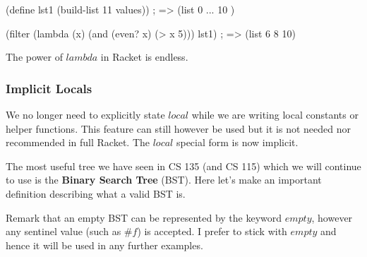 \begin{code}[Lisp]
(define lst1 (build-list 11 values)) ; => (list 0 ... 10 )

(filter (lambda (x) (and (even? x) (> x 5))) lst1) ; => (list 6 8 10)
\end{code}

The power of $lambda$ in Racket is endless.\\


\subsubsection*{Implicit Locals}

We no longer need to explicitly state $local$ while we are writing local constants or helper functions. This feature can still however be used but it is not needed nor recommended in full Racket. The $local$ special form is now implicit.


The most useful tree we have seen in CS 135 (and CS 115) which we will continue to use is the \textbf{Binary Search Tree} (BST). Here let's make an important definition describing what a valid BST is.\\


Remark that an empty BST can be represented by the keyword $empty$, however any sentinel value (such as $\#f$) is accepted. I prefer to stick with $empty$ and hence it will be used in any further examples.\\

